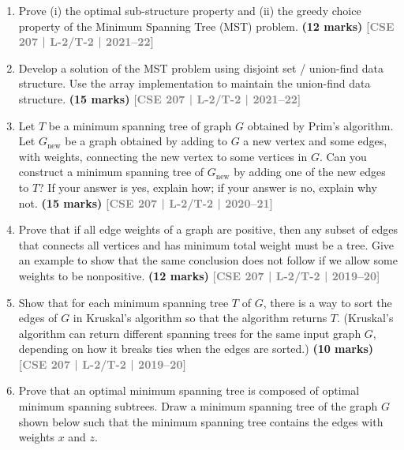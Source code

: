 \documentclass[12pt]{article}
\newcommand{\yr}[1]{\hfill\textcolor{gray}{\small\textbf{[#1]}}}
\newcommand{\mk}[1]{\textcolor{orange!70!black}{\small\textbf{(#1 marks)}}}
\begin{document}
\begin{enumerate}
\begin{center}
\end{center}
\mk{12} \yr{CSE 207 | L-2/T-1 | 2023--24}


\item Prove (i) the optimal sub-structure property and (ii) the greedy choice property of the Minimum Spanning Tree (MST) problem.
\mk{12} \yr{CSE 207 | L-2/T-2 | 2021--22}


\item Develop a solution of the MST problem using disjoint set / union-find data structure. Use the array implementation to maintain the union-find data structure.
\mk{15} \yr{CSE 207 | L-2/T-2 | 2021--22}


\item Let $T$ be a minimum spanning tree of graph $G$ obtained by Prim's algorithm. Let $G_{\text{new}}$ be a graph obtained by adding to $G$ a new vertex and some edges, with weights, connecting the new vertex to some vertices in $G$. Can you construct a minimum spanning tree of $G_{\text{new}}$ by adding one of the new edges to $T$? If your answer is yes, explain how; if your answer is no, explain why not.
\mk{15} \yr{CSE 207 | L-2/T-2 | 2020--21}


\item Prove that if all edge weights of a graph are positive, then any subset of edges that connects all vertices and has minimum total weight must be a tree. Give an example to show that the same conclusion does not follow if we allow some weights to be nonpositive.
\mk{12} \yr{CSE 207 | L-2/T-2 | 2019--20}


\item Show that for each minimum spanning tree $T$ of $G$, there is a way to sort the edges of $G$ in Kruskal's algorithm so that the algorithm returns $T$. (Kruskal's algorithm can return different spanning trees for the same input graph $G$, depending on how it breaks ties when the edges are sorted.)
\mk{10} \yr{CSE 207 | L-2/T-2 | 2019--20}


\item Prove that an optimal minimum spanning tree is composed of optimal minimum spanning subtrees.
 Draw a minimum spanning tree of the graph $G$ shown below such that the minimum spanning tree contains the edges with weights $x$ and $z$.
\begin{center}
  

\end{center}
\end{enumerate}
\end{document}
